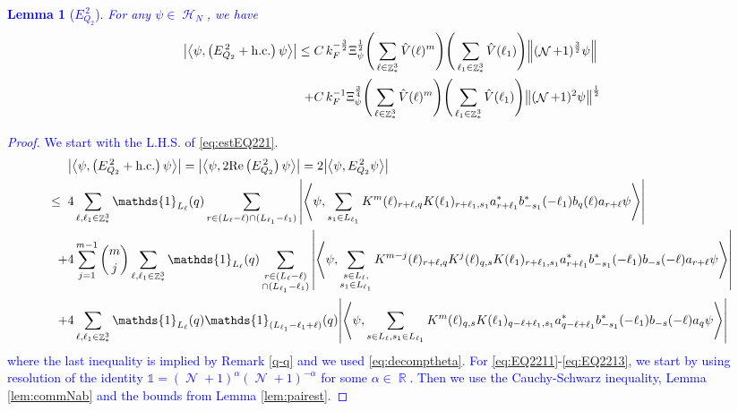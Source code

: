 \documentclass[sn-mathphys, Numbered ,a4paper]{sn-jnl}%
\DeclareMathOperator{\R}{\mathbb{R}}
\DeclareMathOperator{\Z}{\mathbb{Z}}
\DeclareMathOperator{\HH}{\mathcal{H}}
\DeclareMathOperator{\NN}{\mathcal{N}}
\newcommand{\half}{\frac{1}{2}}
\newcommand{\eva}[1]{\left\langle #1 \right\rangle}
\theoremstyle{plain}
\newtheorem{lemma}[theorem]{Lemma}
\theoremstyle{definition}
\theoremstyle{remark}
\theoremstyle{plain}
\theoremstyle{definition}
\theoremstyle{remark}
\begin{document}
\textcolor{blue}{\begin{lemma}[$E_{Q_2}^{\,2}$]\label{lem:EQ221}
    For any $\psi \in \HH_N$, we have
    \begin{alignat}{2}
    	\abs{\eva{\psi,\left(E^{\,2}_{Q_2}+\mathrm{h.c.}\right) \psi }}
    	\leq \; &C\,  k_{F}^{-\frac{3}{2}} \Xi_{\psi}^\half \Bigg(\sum\limits_{\ell \in \Z^3_*} \hat{V}(\ell)^m\Bigg)\Bigg( \sum\limits_{\ell_1 \in \Z^3_*} \hat{V}(\ell_1) \Bigg) \norm { (\NN+1)^{\frac{3}{2}} \psi }\\
    	\;+ &C\, k_{F}^{-1}\Xi_{\psi}^{\frac{3}{4}} \Bigg(\sum\limits_{\ell \in \Z^3_*} \hat{V}(\ell)^m\Bigg) \Bigg(\sum\limits_{\ell_1 \in \Z^3_*} \hat{V}(\ell_1) \Bigg)  \norm{ (\NN+1)^2\psi}^\half\label{eq:estEQ221}
    \end{alignat}
\end{lemma}
\begin{proof}
 We start with the L.H.S. of \eqref{eq:estEQ221}.
 \begin{align}
 	&\abs{\eva{\psi,\left(E^{\,2}_{Q_2}+\mathrm{h.c.}\right) \psi }} = \abs{\eva{\psi,2\mathrm{Re}\left(E^{\,2}_{Q_2}\right) \psi }} = 2\abs{\eva{\psi, E^{\,2}_{Q_2} \psi }}\nonumber\\
 	\leq\;\;& 4\sum\limits_{\ell, \ell_1\in \Z^3_*} \mathds{1}_{L_{\ell}}(q) \sum\limits_{r\in (L_{\ell}-\ell) \cap (L_{\ell_1}-\ell_1)} \abs{\eva{\psi, \sum\limits_{ s_1\in L_{\ell_1} }  K^m(\ell )_{r+\ell,q}K(\ell_1)_{r+\ell_1,s_1}
 			a^*_{r+\ell_1} b^*_{-s_1}(-\ell_1)  b_{q}(\ell)a_{r+\ell} \psi}} \label{eq:EQ2211}\\
 	\;+&4 \sum\limits_{j=1}^{m-1} {{m}\choose j} \sum\limits_{\ell, \ell_1\in \Z^3_*}\mathds{1}_{L_{\ell}}(q) \sum\limits_{\substack{r\in (L_{\ell}-\ell) \\ \cap (L_{\ell_1}-\ell_1)}}  \abs{\eva{\psi, \sum\limits_{ \substack{s \in L_{\ell},\\s_1\in L_{\ell_1}} }   K^{m-j}(\ell)_{r+\ell,q} K^{j}(\ell)_{q,s} K(\ell_1)_{r+\ell_1,s_1} a^*_{r+\ell_1}  b^*_{-s_1}(-\ell_1) b_{-s}(-\ell) a_{r+\ell} \psi }} \label{eq:EQ2212}\\
 	\;+&4\sum\limits_{\ell, \ell_1\in \Z^3_*} \mathds{1}_{L_{\ell}}(q) \mathds{1}_{(L_{\ell_1}-\ell_1+\ell)}(q)  \abs{\eva{\psi, \sum\limits_{s \in L_{\ell},s_1\in L_{\ell_1}} K^m(\ell)_{q,s} K(\ell_1)_{q-\ell+\ell_1,s_1} a^*_{q-\ell+\ell_1} b^*_{-s_1}(-\ell_1) b_{-s}(-\ell) a_{q} \psi}} \label{eq:EQ2213}
 \end{align}
 where the last inequality is implied by Remark \ref{q-q} and we used \eqref{eq:decomptheta}.
 For \eqref{eq:EQ2211}-\eqref{eq:EQ2213}, we start by using resolution of the identity $\mathds{1} = (\NN+1)^{\alpha}(\NN+1)^{-\alpha}$ for some $\alpha \in \R$. Then we use the Cauchy-Schwarz inequality, Lemma \ref{lem:commNab} and the bounds from Lemma \ref{lem:pairest}.

\end{proof}}
\end{document}
